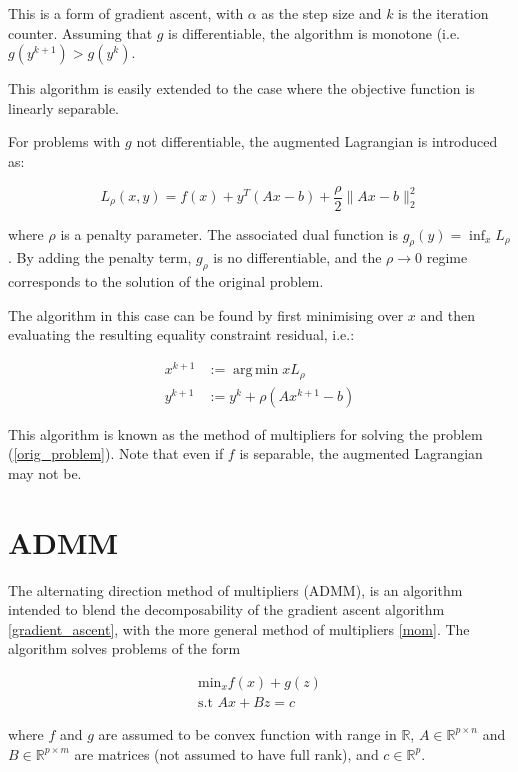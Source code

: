 \documentclass{article}
\DeclareMathOperator*{\argmin}{arg\,min}
\newcommand{\re}{{\mathbb{R}}}
\begin{document}
This is a form of gradient ascent, with \( \alpha \) as the step size and \(k\) is the iteration counter. Assuming that \(g\) is differentiable, the algorithm is monotone (i.e. \( g\left(y^{k+1}\right) > g\left(y^{k}\right)\).

This algorithm is easily extended to the case where the objective function is linearly separable.

For problems with \(g\) not differentiable, the augmented Lagrangian is introduced as:

\begin{equation}
L_\rho\left(x,y\right) = f\left( x \right) + y^T\left(Ax-b\right) + \frac{\rho}{2}\|Ax-b\|_2^2
\end{equation}

where \(\rho\) is a penalty parameter. The associated dual function is \(g_\rho\left(y\right) = \inf_x L_\rho\). By adding the penalty term, \(g_\rho\) is no differentiable, and the \(\rho \rightarrow 0\) regime corresponds to the solution of the original problem. 

The algorithm in this case can be found by first minimising over \(x\) and then evaluating the resulting equality constraint residual, i.e.:

\begin{align}
x^{k+1} &:= \argmin{x} L_\rho \\
y^{k+1} &:= y^{k} + \rho \left(Ax^{k+1} - b\right)
\label{mom}
\end{align}

This algorithm is known as the method of multipliers for solving the problem (\ref{orig_problem}). Note that even if \(f\) is separable, the augmented Lagrangian may not be.

\section{ADMM}
The alternating direction method of multipliers (ADMM), is an algorithm intended to blend the decomposability of the gradient ascent algorithm \ref{gradient_ascent}, with the more general method of multipliers \ref{mom}. The algorithm solves problems of the form

\begin{align}
\text{min}_{x} f\left( x \right) + g\left(z\right)
\\
\text{s.t } Ax +Bz = c
\label{admm}
\end{align}

where \(f\) and \(g\) are assumed to be convex function with range in \(\re\), \(A \in \re^{p \times n}\) and \(B\in \re^{p \times m}\) are matrices (not assumed to have full rank), and \(c \in \re^p\).
\end{document}
